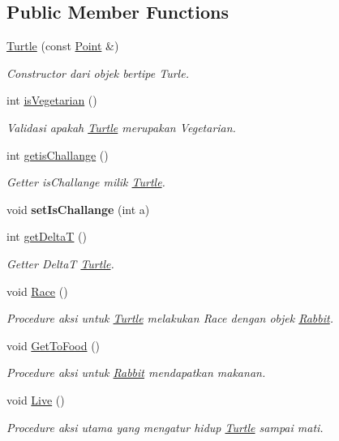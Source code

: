 \subsection*{Public Member Functions}
\begin{DoxyCompactItemize}
\item 
\hyperlink{class_turtle_a1347c5bcaee6ede82a488394cad3cf00}{Turtle} (const \hyperlink{class_point}{Point} \&)
\begin{DoxyCompactList}\small\item\em Constructor dari objek bertipe Turle. \end{DoxyCompactList}\item 
int \hyperlink{class_turtle_aaa6ea76ca2e8b21b18ac65ef4b4663d9}{is\+Vegetarian} ()
\begin{DoxyCompactList}\small\item\em Validasi apakah \hyperlink{class_turtle}{Turtle} merupakan Vegetarian. \end{DoxyCompactList}\item 
int \hyperlink{class_turtle_abeb5244ae5dc51006d3e1d0ca7c048c1}{getis\+Challange} ()
\begin{DoxyCompactList}\small\item\em Getter is\+Challange milik \hyperlink{class_turtle}{Turtle}. \end{DoxyCompactList}\item 
void {\bfseries set\+Is\+Challange} (int a)\hypertarget{class_turtle_a01eb5b88af5f7cc0550ee836be552a37}{}\label{class_turtle_a01eb5b88af5f7cc0550ee836be552a37}

\item 
int \hyperlink{class_turtle_a707d466a9d8ce18d27367b49403249d7}{get\+DeltaT} ()
\begin{DoxyCompactList}\small\item\em Getter DeltaT \hyperlink{class_turtle}{Turtle}. \end{DoxyCompactList}\item 
void \hyperlink{class_turtle_acf11aca3cdcf6aeebac4aac8c2ec416f}{Race} ()
\begin{DoxyCompactList}\small\item\em Procedure aksi untuk \hyperlink{class_turtle}{Turtle} melakukan Race dengan objek \hyperlink{class_rabbit}{Rabbit}. \end{DoxyCompactList}\item 
void \hyperlink{class_turtle_a1f2ab308068556b2621d5acd8eda5413}{Get\+To\+Food} ()
\begin{DoxyCompactList}\small\item\em Procedure aksi untuk \hyperlink{class_rabbit}{Rabbit} mendapatkan makanan. \end{DoxyCompactList}\item 
void \hyperlink{class_turtle_abac9610f1eb0b0894b91cd86173bc257}{Live} ()
\begin{DoxyCompactList}\small\item\em Procedure aksi utama yang mengatur hidup \hyperlink{class_turtle}{Turtle} sampai mati. \end{DoxyCompactList}\end{DoxyCompactItemize}
